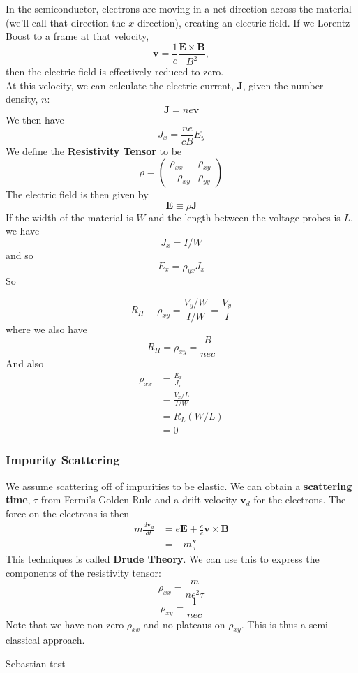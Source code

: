 \documentclass{article}
\begin{document}
	In the semiconductor, electrons are moving in a net direction across the material (we'll call that direction the $x$-direction), creating an electric field. If we Lorentz Boost to a frame at that velocity, 
	$$\mathbf{v}=\frac{1}{c}\frac{\mathbf{E}\times\mathbf{B}}{B^2},$$
	then the electric field is effectively reduced to zero. \\
	
	\noindent At this velocity, we can calculate the electric current, $\mathbf{J}$, given the number density, $n$:
	$$\mathbf{J}=ne\mathbf{v}$$
	We then have
	$$J_x=\frac{ne}{cB}E_y$$
	We define the \textbf{Resistivity Tensor} to be
	$$\rho=\begin{pmatrix} \rho_{xx} & \rho_{xy}\\ -\rho_{xy} & \rho_{yy} \end{pmatrix}$$
	The electric field is then given by
	$$\mathbf{E}\equiv \rho \mathbf{J}$$
	If the width of the material is $W$ and the length between the voltage probes is $L$, we have
	$$J_x=I/W$$
	and so $$E_x=\rho_{yx} J_x$$
	So 
	
	$$R_H\equiv \rho_{xy}=\frac{V_y/W}{I/W}=\frac{V_y}{I}$$
	where we also have 
	$$R_H=\rho_{xy}=\frac{B}{nec}$$
	And also
	\begin{align*}
		\rho_{xx}&=\frac{E_x}{J_x}\\
		&=\frac{V_x/L}{I/W}\\
		&=R_L(W/L)\\
		&=0
	\end{align*}	
	\subsubsection{Impurity Scattering}
	We assume scattering off of impurities to be elastic. We can obtain a \textbf{scattering time}, $\tau$ from Fermi's Golden Rule and a drift velocity $\mathbf{v}_d$ for the electrons. The force on the electrons is then
	\begin{align*}
		m\frac{d\mathbf{v}_d}{dt}&=e\mathbf{E}+\frac{e}{c}\mathbf{v}\times \mathbf{B}\\
		&=-m\frac{\mathbf{v}}{\tau}
	\end{align*}
	This techniques is called \textbf{Drude Theory}. We can use this to express the components of the resistivity tensor:
	$$\rho_{xx}=\frac{m}{ne^2\tau}$$
	$$\rho_{xy}=\frac{1}{nec}$$
	Note that we have non-zero $\rho_{xx}$ and no plateaus on $\rho_{xy}$. This is thus a semi-classical approach.	







Sebastian test
\end{document}
